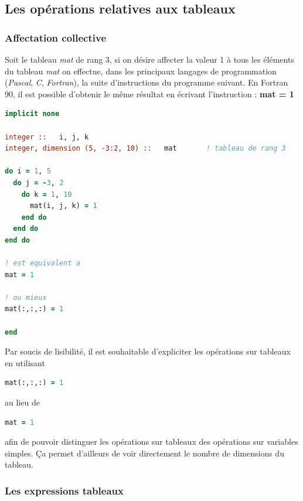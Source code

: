 \documentclass[a4paper,twoside]{article}
\begin{document}
\subsection{Les opérations relatives aux tableaux}

\subsubsection{Affectation collective}

Soit le tableau \emph{mat} de rang 3, si on désire affecter la valeur 1 à tous les éléments du tableau \emph{mat} on effectue, dans les principaux langages de programmation (\emph{Pascal}, \emph{C}, \emph{Fortran}), la suite d'instructions du programme suivant. En Fortran 90, il est possible d'obtenir le même résultat en écrivant l'instruction : \textbf{mat = 1}


\begin{lstlisting}[language=Fortran]
implicit none 
  
integer ::   i, j, k       
integer, dimension (5, -3:2, 10) ::   mat       ! tableau de rang 3 

do i = 1, 5 
  do j = -3, 2 
    do k = 1, 10 
      mat(i, j, k) = 1 
    end do 
  end do 
end do 

! est equivalent a 
mat = 1

! ou mieux
mat(:,:,:) = 1

end
\end{lstlisting}

\begin{remarque}
Par soucis de lisibilité, il est souhaitable d'expliciter les opérations sur tableaux en utilisant 
\begin{lstlisting}[language=Fortran]
mat(:,:,:) = 1
\end{lstlisting}
au lieu de 
\begin{lstlisting}[language=Fortran]
mat = 1
\end{lstlisting}
afin de pouvoir distinguer les opérations sur tableaux des opérations sur variables simples. Ça permet d'ailleurs de voir directement le nombre de dimensions du tableau.

\end{remarque}



\subsubsection{Les expressions tableaux}
\end{document}
